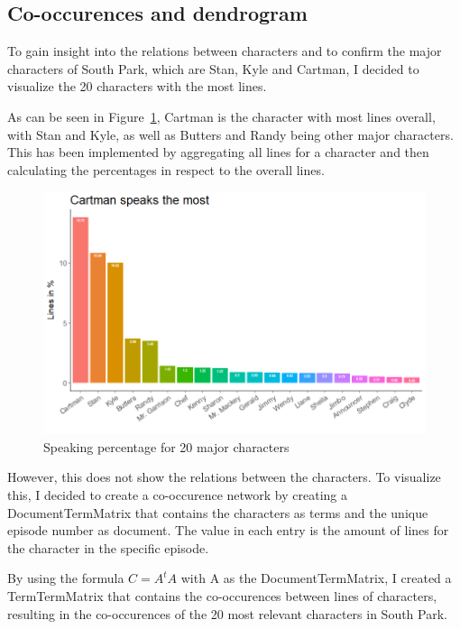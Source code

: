 \documentclass[10pt,a4paper]{article}
\begin{document}
	
	
	\subsection{Co-occurences and dendrogram}
	To gain insight into the relations between characters and to confirm the major characters of South Park, which are Stan, Kyle and Cartman, I decided to visualize the 20 characters with the most lines.
	
	As can be seen in Figure~\ref{fig:SpeakingPercentage}, Cartman is the character with most lines overall, with Stan and Kyle, as well as Butters and Randy being other major characters. This has been implemented by aggregating all lines for a character and then calculating the percentages in respect to the overall lines.
	
	\begin{figure}[h]
	\centering
	\includegraphics[scale=0.5]{images/speakingPercentage.png}
	\caption{Speaking percentage for 20 major characters}
	\label{fig:SpeakingPercentage}
	\end{figure}	
	
	
	However, this does not show the relations between the characters. To visualize this, I decided to create a co-occurence network by creating a DocumentTermMatrix that contains the characters as terms and the unique episode number as document. The value in each entry is the amount of lines for the character in the specific episode.
	
	 By using the formula $C = A^tA$ with A as the DocumentTermMatrix, I created a TermTermMatrix that contains the co-occurences between lines of characters, resulting in the co-occurences of the 20 most relevant characters in South Park.
	
\end{document}
